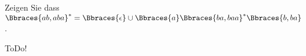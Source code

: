 
\begin{exercise}

Zeigen Sie dass $\Bbraces{ab, aba}^\ast = \Bbraces{\epsilon} \cup \Bbraces{a} \Bbraces{ba, baa}^\ast \Bbraces{b, ba}$.

\end{exercise}


\begin{solution}

ToDo!

\end{solution}

